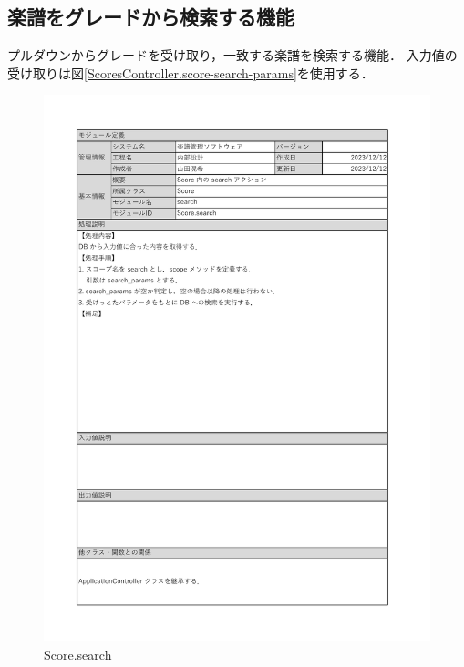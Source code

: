 \subsection*{楽譜をグレードから検索する機能}
プルダウンからグレードを受け取り，一致する楽譜を検索する機能．
入力値の受け取りは図\ref{ScoresController.score-search-params}を使用する．
\begin{figure}[H]
    \centering
    \includegraphics[scale=0.5]{img/Method/Score_search(scope).pdf}
    \caption{Score.search}
\end{figure}
\clearpage

